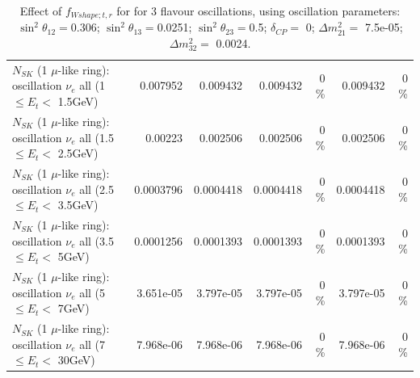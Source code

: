 \begin{table}
\begin{tabular}{| l | r | r | r  r | r  r |}
$N_{SK}$ (1 $\mu$-like ring): oscillation $\nu_{e}$ all (1 $\leq E_{t} <$ 1.5GeV) &        0.007952 &        0.009432 &        0.009432 &        0 \%  &        0.009432 &        0 \%  \\ 
$N_{SK}$ (1 $\mu$-like ring): oscillation $\nu_{e}$ all (1.5 $\leq E_{t} <$ 2.5GeV) &         0.00223 &        0.002506 &        0.002506 &        0 \%  &        0.002506 &        0 \%  \\ 
$N_{SK}$ (1 $\mu$-like ring): oscillation $\nu_{e}$ all (2.5 $\leq E_{t} <$ 3.5GeV) &       0.0003796 &       0.0004418 &       0.0004418 &        0 \%  &       0.0004418 &        0 \%  \\ 
$N_{SK}$ (1 $\mu$-like ring): oscillation $\nu_{e}$ all (3.5 $\leq E_{t} <$ 5GeV) &       0.0001256 &       0.0001393 &       0.0001393 &        0 \%  &       0.0001393 &        0 \%  \\ 
 $N_{SK}$ (1 $\mu$-like ring): oscillation $\nu_{e}$ all (5 $\leq E_{t} <$ 7GeV) &       3.651e-05 &       3.797e-05 &       3.797e-05 &        0 \%  &       3.797e-05 &        0 \%  \\ 
$N_{SK}$ (1 $\mu$-like ring): oscillation $\nu_{e}$ all (7 $\leq E_{t} <$ 30GeV) &       7.968e-06 &       7.968e-06 &       7.968e-06 &        0 \%  &       7.968e-06 &        0 \%  \\ 
\hline
\hline
\end{tabular}
\caption{ Effect of $f_{Wshape; t, r}$ for for 3 flavour oscillations, using oscillation parameters:  $\sin^2\theta_{12} = $0.306; $\sin^2\theta_{13} = $0.0251; $\sin^2\theta_{23} = $0.5; $\delta_{CP} = $        0; $\Delta m^2_{21} = $    7.5e-05; $\Delta m^2_{32} = $    0.0024. }
\label{tab:num_xsec_wshape_1RmuT_3f_osc_t13:0.0251}
\end{table}
\clearpage
